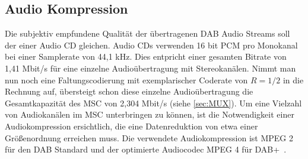 \subsection{Audio Kompression}
Die subjektiv empfundene Qualität der übertragenen DAB Audio Streams soll der einer Audio CD gleichen. Audio CDs verwenden 16 bit PCM pro Monokanal bei einer Samplerate von 44,1 kHz. Dies entpricht einer gesamten Bitrate von 1,41 Mbit/s für eine einzelne Audioübertragung mit Stereokanälen. Nimmt man nun noch eine Faltungscodierung mit exemplarischer Coderate von $R=1/2$ in die Rechnung auf, übersteigt schon diese einzelne Audioübertragung die Gesamtkapazität des \ac{MSC} von 2,304 Mbit/s (siehe \ref{sec:MUX}). Um eine Vielzahl von Audiokanälen im \ac{MSC} unterbringen zu können, ist die Notwendigkeit einer Audiokompression ersichtlich, die eine Datenreduktion von etwa einer Größenordnung erreichen muss. Die verwendete Audiokompression ist \ac{MPEG 2}~\cite{etsi:mp2} für den DAB Standard und der optimierte Audiocodec \ac{MPEG 4} für DAB+~\cite{etsi:mp4}.\\


